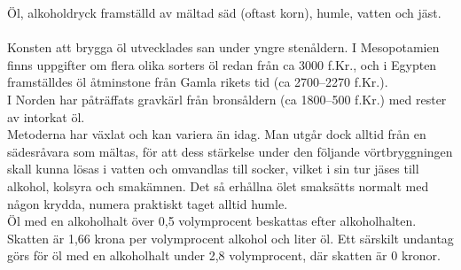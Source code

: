 \vspace{10pt}
Öl, alkoholdryck framställd av mältad säd (oftast korn), humle, vatten
och jäst.\\
\\
Konsten att brygga öl utvecklades san under yngre
stenåldern. I Mesopotamien finns uppgifter om flera olika sorters öl
redan från ca 3000 f.Kr., och i Egypten framställdes öl åtminstone
från Gamla rikets tid (ca 2700–2270 f.Kr.).\\ I Norden har påträffats
gravkärl från bronsåldern (ca 1800–500 f.Kr.) med rester av intorkat
öl.\\ Metoderna har växlat och kan variera än idag. Man utgår dock
alltid från en sädesråvara som mältas, för att dess stärkelse under
den följande vörtbryggningen skall kunna lösas i vatten och omvandlas
till socker, vilket i sin tur jäses till alkohol, kolsyra och
smakämnen. Det så erhållna ölet smaksätts normalt med någon krydda,
numera praktiskt taget alltid humle.\\ Öl med en alkoholhalt över 0,5
volymprocent beskattas efter alkoholhalten. Skatten är 1,66 krona per
volymprocent alkohol och liter öl. Ett särskilt undantag görs för öl
med en alkoholhalt under 2,8 volymprocent, där skatten är 0 kronor.
